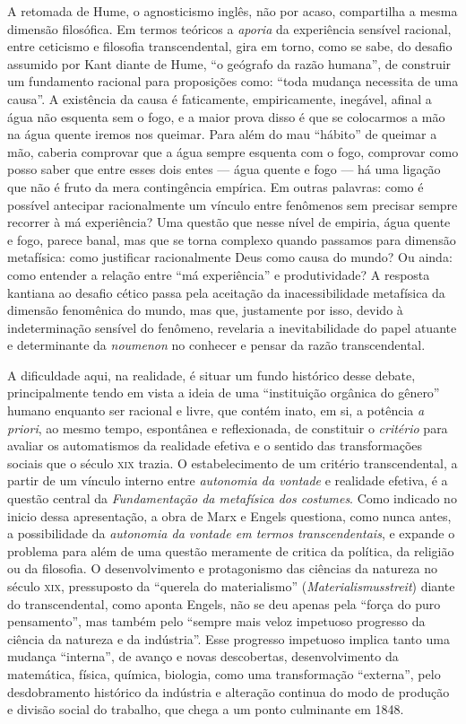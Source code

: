 A retomada de Hume, o agnosticismo inglês, não por acaso, compartilha a
mesma dimensão filosófica. Em termos teóricos a \emph{aporia} da
experiência sensível racional, entre ceticismo e filosofia
transcendental, gira em torno, como se sabe, do desafio assumido por
Kant diante de Hume, ``o geógrafo da razão humana'', de construir um
fundamento racional para proposições como: ``toda mudança necessita de
uma causa''. A existência da causa é faticamente, empiricamente,
inegável, afinal a água não esquenta sem o fogo, e a maior prova disso é
que se colocarmos a mão na água quente iremos nos queimar. Para além do
mau ``hábito'' de queimar a mão, caberia comprovar que a água sempre
esquenta com o fogo, comprovar como posso saber que entre esses dois
entes --- água quente e fogo --- há uma ligação que não é fruto da mera
contingência empírica. Em outras palavras: como é possível antecipar
racionalmente um vínculo entre fenômenos sem precisar sempre recorrer à
má experiência? Uma questão que nesse nível de empiria, água quente e
fogo, parece banal, mas que se torna complexo quando passamos para
dimensão metafísica: como justificar racionalmente Deus como causa do
mundo? Ou ainda: como entender a relação entre ``má experiência'' e
produtividade? A resposta kantiana ao desafio cético passa pela
aceitação da inacessibilidade metafísica da dimensão fenomênica do
mundo, mas que, justamente por isso, devido à indeterminação sensível do
fenômeno, revelaria a inevitabilidade do papel atuante e determinante da
\emph{noumenon} no conhecer e pensar da razão transcendental.

A dificuldade aqui, na realidade, é situar um fundo histórico desse
debate, principalmente tendo em vista a ideia de uma ``instituição
orgânica do gênero'' humano enquanto ser racional e livre, que contém
inato, em si, a potência \emph{a priori}, ao mesmo tempo, espontânea e
reflexionada, de constituir o \emph{critério} para avaliar os
automatismos da realidade efetiva e o sentido das transformações sociais
que o século \textsc{xix} trazia. O estabelecimento de um critério
transcendental, a partir de um vínculo interno entre \emph{autonomia da
vontade} e realidade efetiva, é a questão central da \emph{Fundamentação
da metafísica dos costumes}. Como indicado no inicio dessa apresentação,
a obra de Marx e Engels questiona, como nunca antes, a possibilidade da
\emph{autonomia da vontade em termos transcendentais}, e expande o
problema para além de uma questão meramente de critica da política, da
religião ou da filosofia. O desenvolvimento e protagonismo das ciências
da natureza no século \textsc{xix}, pressuposto da ``querela do
materialismo'' (\emph{Materialismusstreit}) diante do transcendental,
como aponta Engels, não se deu apenas pela ``força do puro pensamento'',
mas também pelo ``sempre mais veloz impetuoso progresso da ciência da
natureza e da indústria''. Esse progresso impetuoso implica tanto uma
mudança ``interna'', de avanço e novas descobertas, desenvolvimento da
matemática, física, química, biologia, como uma transformação
``externa'', pelo desdobramento histórico da indústria e alteração
continua do modo de produção e divisão social do trabalho, que chega a
um ponto culminante em 1848.

